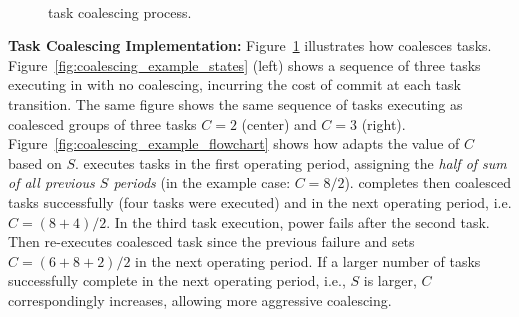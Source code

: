 \begin{figure}
	\centering
	\\
	\caption{\sys task coalescing process.}
	\label{fig:coalescing_example}
\end{figure}

\noindent\textbf{Task Coalescing Implementation:} Figure~\ref{fig:coalescing_example} illustrates how \sys coalesces tasks. Figure~\ref{fig:coalescing_example_states} (left) shows a sequence of three tasks executing in \sys with no coalescing, incurring the cost of commit at each task transition. The same figure shows the same sequence of tasks executing as coalesced groups of three tasks $C=2$ (center) and $C=3$ (right). Figure~\ref{fig:coalescing_example_flowchart} shows how \sys adapts the value of $C$ based on $S$. \sys executes tasks in the first operating period, assigning the \emph{half of sum of all previous $S$ periods} (in the example case: $C=8/2$). \sys completes then coalesced tasks successfully (four tasks were executed) and in the next operating period, i.e. $C=(8+4)/2$. In the third task execution, power fails after the second task. Then \sys re-executes coalesced task since the previous failure and sets $C=(6+8+2)/2$ in the next operating period. If a larger number of tasks successfully complete in the next operating period, i.e., $S$ is larger, $C$ correspondingly increases, allowing more aggressive coalescing.


